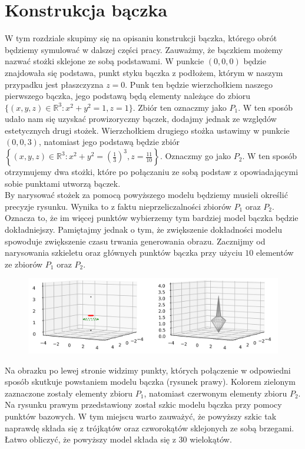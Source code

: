 \documentclass[a4paper,twoside,11pt,reqno]{mwrep}
\theoremstyle{plain} \newtheorem{twr}{Twierdzenie}
\theoremstyle{plain} \newtheorem{lem}{Lemat}
\theoremstyle{definition} \newtheorem{defi}{Definicja}
\theoremstyle{remark} \newtheorem*{wni}{Wniosek}
\theoremstyle{definition} \newtheorem{uwaga}{Uwaga}
\theoremstyle{definition}\newtheorem{prz}{Przykład}
\begin{document}
\section{Konstrukcja bączka}
W tym rozdziale skupimy się na opisaniu konstrukcji bączka, którego obrót będziemy symulować w dalszej części pracy.
Zauważmy, że bączkiem możemy nazwać stożki sklejone ze sobą podstawami. 
W punkcie $(0,0,0)$ będzie znajdowała się podstawa, punkt styku bączka
z podłożem, którym w naszym przypadku jest płaszczyzna $z=0$. Punk ten będzie wierzchołkiem naszego pierwszego bączka,
jego podstawą będą elementy należące do zbioru \\
$\lbrace (x,y,z)\in\mathbb{R}^3: x^2+y^2 = 1, z=1\rbrace$. Zbiór ten oznaczmy jako $P_1$. W ten sposób udało nam się uzyskać prowizoryczny bączek, dodajmy jednak ze względów estetycznych drugi stożek. Wierzchołkiem drugiego stożka ustawimy w punkcie
$(0,0,3)$, natomiast jego podstawą będzie zbiór 
$\left\lbrace (x,y,z)\in\mathbb{R}^3: x^2+y^2 = \left(\frac{1}{3}\right)^3, z=\frac{11}{10}\right\rbrace$. Oznaczmy go jako
$P_2$. W ten sposób otrzymujemy dwa stożki, które po połączaniu ze sobą podstaw z opowiadającymi sobie punktami utworzą 
bączek.\\

By narysować stożek za pomocą powyższego modelu będziemy musieli określić precyzje rysunku. Wynika to z faktu nieprzeliczalności
zbiorów $P_1$ oraz $P_2$. Oznacza to, że im więcej punktów wybierzemy tym bardziej model bączka będzie dokładniejszy.
Pamiętajmy jednak o tym, że zwiększenie dokładności modelu spowoduje zwiększenie czasu trwania generowania obrazu.
Zacznijmy od narysowania szkieletu oraz głównych punktów bączka przy użyciu $10$ elementów ze zbiorów $P_1$ oraz $P_2$.
\begin{figure}[h]
\begin{center}
\includegraphics[width=12 cm]{skrech.png}
\end{center}
\end{figure}

Na obrazku po lewej stronie widzimy punkty, których połączenie w odpowiedni sposób skutkuje powstaniem modelu bączka 
(rysunek prawy). Kolorem zielonym zaznaczone zostały elementy zbioru $P_1$, natomiast czerwonym elementy zbioru $P_2$.
Na rysunku prawym przedstawiony został szkic modelu bączka przy pomocy punktów bazowych. W tym miejscu warto zauważyć,
że powyższy szkic tak naprawdę składa się z trójkątów oraz czworokątów sklejonych ze sobą brzegami. 
Łatwo obliczyć, że powyższy model składa się z $30$ wielokątów. 
\end{document}
